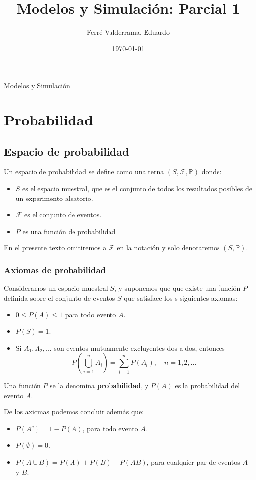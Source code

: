 \documentclass[11pt, a4paper]{article}
\title{Modelos y Simulación: Parcial 1}
\author{Ferré Valderrama, Eduardo}
\date{\today}
\theoremstyle{definition}
\begin{document}
\maketitle
Modelos y Simulación
\tableofcontents

\newpage

\section{Probabilidad}

\subsection{Espacio de probabilidad}

Un espacio de probabilidad se define como una terna $(S, \mathcal{F}, \mathbb{P} )$ donde:
\begin{itemize}
    \item $S$ es el espacio muestral, que es el conjunto de todos los resultados posibles de un experimento aleatorio.
    \item $\mathcal{F}$ es el conjunto de eventos.
    \item $P$ es una función de probabilidad
\end{itemize}

En el presente texto omitiremos a $\mathcal{F}$ en la notación y solo denotaremos $(S, \mathbb{P})$.

\subsubsection{Axiomas de probabilidad}

Consideramos un espacio muestral $S$, y suponemos que que existe una función $P$ definida sobre el conjunto de eventos $S$ que satisface los 
s siguientes axiomas:
\begin{itemize}
    \item $0 \leq P(A) \leq 1$ para todo evento $A$.
    \item $P(S) = 1$.
    \item Si $A_1, A_2, ...$ son eventos mutuamente excluyentes dos a dos, entonces
        \[
        P\left( \bigcup_{i=1}^{n} A_i \right) = \sum_{i=1}^{n} P(A_i), \quad n = 1, 2, \ldots
        \]
\end{itemize}

Una función $P$ se la denomina \textbf{probabilidad}, y $P(A)$ es la probabilidad del evento $A$.

De los axiomas podemos concluir además que:
\begin{itemize}
    \item $P(A^c) = 1 - P(A)$, para todo evento $A$.
    \item $P(\emptyset) = 0$.
    \item $P(A \cup B) = P(A) + P(B) - P(AB)$, para cualquier par de eventos $A$ y $B$.
  \end{itemize}
\end{document}
